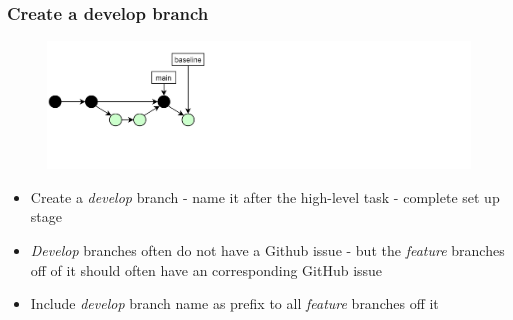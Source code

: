 \documentclass[aspectratio=169]{beamer} %
\begin{document}
\begin{frame}
	\frametitle{Create a develop branch}

	\vspace{-.5cm}
	\begin{minipage}[t][5cm][t]{\textwidth}
		\begin{figure}
			\centering
			\includegraphics[width=\textwidth]{./img/dime-gitflow-network-2-1.png}
		\end{figure}
	\end{minipage}

	\vspace{-.5cm}
	\begin{minipage}[t][5cm][t]{\textwidth}
		\begin{itemize}
			\setlength\itemsep{.5em}
			\item Create a \textit{develop} branch
			- name it after the high-level task
			- complete set up stage
			\item \textit{Develop} branches often do not have a Github issue
			- but the \textit{feature} branches off of it
			should often have an corresponding GitHub issue
			\item Include \textit{develop} branch name as prefix
			to all \textit{feature} branches off it
		\end{itemize}
	\end{minipage}
\end{frame}
\end{document}
